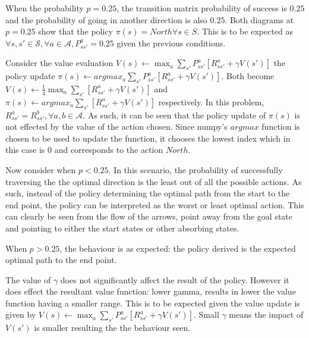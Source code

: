 \documentclass[12pt,a4paper]{report}
\begin{document}
\begin{landscape}
\begin{center}
\begin{tabular}{c || c  c  c}
    \end{tabular}        
\end{center}
\end{landscape}
\break

When the probability $p = 0.25$, the transition matrix probability
of success is $0.25$ and the probability of going in another direction
is also $0.25$.
Both diagrams at $p = 0.25$ show that the policy $\pi(s) = North \forall s \in S$.
This is to be expected as
$ \forall s, s' \in \mathcal{S}, \forall a \in \mathcal{A}, P^a_{ss'} = 0.25$ given 
the previous conditions. 

Consider the value evaluation 
$V(s) \leftarrow \max_a \sum_{s'} P^a_{ss'}[R^a_{ss'} + \gamma V(s')]$
the policy update $\pi(s) \leftarrow argmax_a \sum_{s'} P^a_{ss'}[R^a_{ss'} + \gamma V(s')]$.
Both become $V(s) \leftarrow \frac{1}{4}\max_a \sum_{s'} [R^a_{ss'} + \gamma V(s')]$
and $\pi(s) \leftarrow argmax_a \sum_{s'} [R^a_{ss'} + \gamma V(s')]$
respectively.
In this problem, $R^a_{ss'} = R^b_{ss'}, \forall a, b \in \mathcal{A}$. 
As such, it can be seen that the policy update of $\pi(s)$ is 
not effected by the value of the action chosen. Since numpy's
$argmax$ function is chosen to be used to update the function, 
it chooses the lowest index which in this case is $0$ and corresponds
to the action $North$. 

Now consider when $p < 0.25$.
In this scenario, the probability of successfully traversing the the
optimal direction is the least out of all the possible actions.
As such, instead of the policy determining the optimal path from the
start to the end point, the policy can be interpreted as the worst
or least optimal action. This can clearly be seen from the flow 
of the arrows, point away from the goal state and pointing to either
the start states or other absorbing states. 

When $p > 0.25$, the behaviour is as expected: the policy derived
is the expected optimal path to the end point.

The value of $\gamma$ does not significantly affect the 
result of the policy.
However it does effect the resultant value function:
lower gamma, results in lower the value function having a smaller 
range. This is to be expected given the value update is given by 
$V(s) \leftarrow \max_a \sum_{s'} P^a_{ss'}[R^a_{ss'} + \gamma V(s')]$.
Small $\gamma$ means the impact of $V(s')$ is smaller resulting the 
the behaviour seen.
\end{document}
